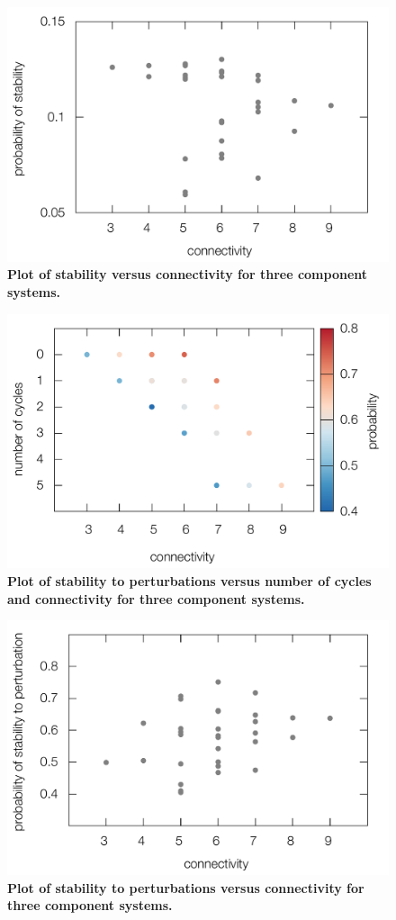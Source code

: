 \begin{figure}[!ht]
\centering
\noindent\includegraphics[width=0.8\columnwidth]{fig/apstab3x3.pdf}
\caption{{\bf Plot of stability versus connectivity for three component systems.} }
\label{fig:apstab3x3}
\end{figure}

\begin{figure}[!ht]
\centering
\noindent\includegraphics[width=0.8\columnwidth]{fig/connectcycle3D3x3.pdf}
\caption{{\bf Plot of stability to perturbations versus number of cycles and connectivity for three component systems.} }
\label{fig:connectcycle3D3x3}
\end{figure}

\begin{figure}[!ht]
\centering
\noindent\includegraphics[width=0.8\columnwidth]{fig/stab3x3.pdf}
\caption{{\bf Plot of stability to perturbations versus connectivity for three component systems.} }
\label{fig:stab3x3}
\end{figure}

